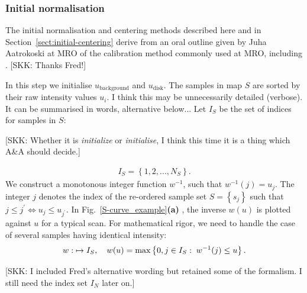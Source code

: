 \documentclass{aa}
\newcommand{\fg}[1]{\textcolor{midblue}{#1}}
\newcommand{\skk}[1]{\textcolor{midorange}{[SKK: #1]}} %
\newcommand{\eqnl}[2]{\begin{eqnarray}\label{#1}#2\end{eqnarray}}
\renewcommand{\max}[1]{\operatorname{max} \left\{ #1 \right\}}
\newcommand{\s}[2]{{#1}_{\mathrm{#2}}}
\begin{document}
  \subsubsection{Initial normalisation}\label{sect:s-curve}

  The initial normalisation and centering methods described here and in Section~\ref{sect:initial-centering} derive from 
  an oral outline given by Juha Aatrokoski at MRO of the calibration method commonly used at MRO, including 
  \citet{metsahovi40}.
  \skk{Thanks Fred!}


  In this step we initialise $\s{u}{background}$ and $\s{u}{disk}$. The samples in map $S$ are sorted by their raw 
  intensity values $u_i$. \fg{I think this may be unnecessarily detailed (verbose). It can be summarised in words, 
  alternative below...} Let $I_S$ be the set of indices for samples in $S$:

  \skk{Whether it is \emph{initialize} or \emph{initialise}, I think this time it is a thing which A\&A should decide.}

  \eqnl{S-curve_indices}{
  I_S = \left\{ 1, 2, ..., N_S \right\} \text{.}
  }
  We construct a monotonous integer function $w^{-1}$, such that
  $w^{-1}(j) = u_j$.
  The integer $j$ denotes the index of the re-ordered sample set $S = \left\{ s_j \right\}$ such
  that $j \le j^{\prime} \Leftrightarrow u_{j} \le u_{j^{\prime}}.$
  In Fig.~\ref{S-curve_example}{\bf(a)} , the inverse $w(u)$ is plotted against
  $u$ for a typical scan. For mathematical rigor, we need to handle the case of several samples having identical intensity:
  \eqnl{scurve-inverse-rigor}{
  w:\;\real \mapsto I_S, \quad w(u) = \max{0, j \in I_S:\; w^{-1}(j) \le u} \text{.}
  }

  \skk{I included Fred's alternative wording but retained some of the formalism. I still need the index set $I_N$ later on.}

\end{document}
